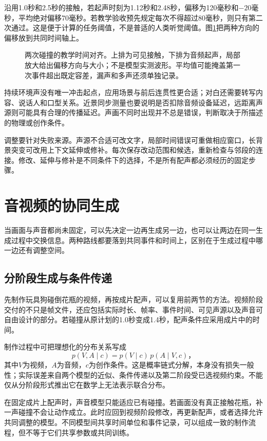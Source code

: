 沿用1.0秒和2.5秒的接触，若起声时刻为1.12秒和2.48秒，偏移为120毫秒和$-20$毫秒，平均绝对偏移70毫秒。若教学验收预先规定每次不得超过80毫秒，则只有第二次通过。这是便于计算的任务阈值，不是普适的人类听觉阈值。图\ref{fig:vision-event-sync}把两种方向的偏移放到共同时间轴上。

\begin{figure}[htbp]
  \centering
  
  \caption{两次碰撞的教学时间对齐。上排为可见接触，下排为音频起声，局部放大给出偏移方向与大小；不是模型实测波形。平均值可能掩盖第一次事件超出既定容差，漏声和多声还须单独记录。}
  \label{fig:vision-event-sync}
\end{figure}
\FloatBarrier

持续环境声没有唯一冲击起点，应用场景与前后连贯性更合适；对白还需要转写内容、说话人和口型关系。近景同步测量也要说明是否扣除音频设备延迟，远距离声源则可能具有合理的传播延迟。声画不同时出现并不总是错误，判断取决于所描述的物理或创作条件。

调整要针对失败来源。声源不合适可改文字，局部时间错误可重做相应窗口，长背景突变可改用上下文延伸或修补。每次保存改动范围和候选，重新检查与邻段的连接。修改、延伸与修补是不同条件下的选择，不是所有配声都必须经历的固定步骤。

\section{音视频的协同生成}
\label{sec:vision-multigen-joint}

当画面与声音都尚未固定，可以先决定一边再生成另一边，也可以让两边在同一生成过程中交换信息。两种路线都要落到共同事件和时间上，区别在于生成过程中哪一边还有调整空间。

\subsection{分阶段生成与条件传递}
\label{sec:vision-multigen-staged}

先制作玩具狗碰倒花瓶的视频，再按成片配声，可以复用前两节的方法。视频阶段交付的不只是帧文件，还应包括实际时长、帧率、事件时间、可见声源以及声音可自由设计的部分。若碰撞从原计划的1.0秒变成1.4秒，配声条件应采用成片中的时间。

制作过程中可把理想化的分布关系写成
\[
  p(V,A\mid c)=p(V\mid c)\,p(A\mid V,c)\text{，}
\]
其中$V$为视频，$A$为音频，$c$为创作条件。这是概率链式分解，本身没有损失一般性；实际误差来自两个模型的近似、条件传递以及第二阶段受已选视频约束。不能仅从分阶段形式推出它在数学上无法表示联合分布。

在固定成片上配声时，声音模型只能适应已有碰撞。若画面没有真正接触花瓶，补一声碰撞不会让动作成立。此时应回到视频阶段修改，再更新配声，或者选择允许共同调整的模型。不同模型间共享时间单位和事件记录，可以组成一致的制作流程，但不等于它们共享参数或共同训练。

